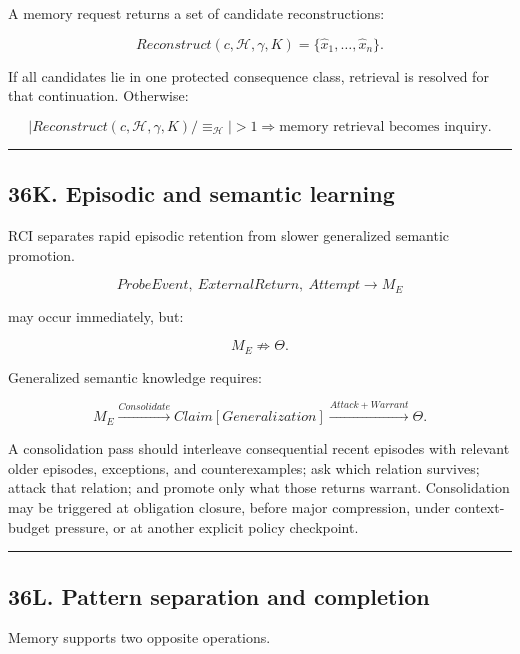 \documentclass[
]{article}
\begin{document}
A memory request returns a set of candidate reconstructions:

\[
\boxed{
Reconstruct(c,\mathcal H,\gamma,K)
=
\{\widehat x_1,\ldots,\widehat x_n\}.
}
\]

If all candidates lie in one protected consequence class, retrieval is resolved
for that continuation. Otherwise:

\[
\boxed{
\left|
Reconstruct(c,\mathcal H,\gamma,K)/{\equiv_{\mathcal H}}
\right|>1
\Rightarrow
\text{memory retrieval becomes inquiry}.
}
\]

\begin{center}\rule{0.5\linewidth}{0.5pt}\end{center}

\subsection{36K. Episodic and semantic learning}\label{episodic-and-semantic-learning}

RCI separates rapid episodic retention from slower generalized semantic
promotion.

\[
\boxed{
ProbeEvent,\ ExternalReturn,\ Attempt
\longrightarrow
M_E
}
\]

may occur immediately, but:

\[
\boxed{
M_E\not\Rightarrow\Theta.
}
\]

Generalized semantic knowledge requires:

\[
\boxed{
M_E
\xrightarrow{Consolidate}
Claim[Generalization]
\xrightarrow{Attack+Warrant}
\Theta.
}
\]

A consolidation pass should interleave consequential recent episodes with
relevant older episodes, exceptions, and counterexamples; ask which relation
survives; attack that relation; and promote only what those returns warrant.
Consolidation may be triggered at obligation closure, before major compression,
under context-budget pressure, or at another explicit policy checkpoint.

\begin{center}\rule{0.5\linewidth}{0.5pt}\end{center}

\subsection{36L. Pattern separation and completion}\label{pattern-separation-and-completion}

Memory supports two opposite operations.
\end{document}
